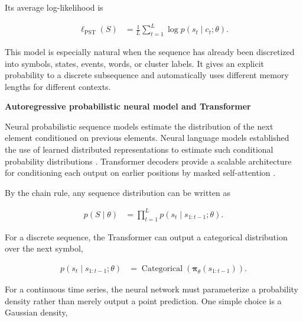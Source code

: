 \documentclass{book}
\providecommand{\ProjectDeepHeading}[2]{%
    \par\medskip\noindent\textbf{#2}\par\smallskip
}
\begin{document}
        \noindent
        Its average log-likelihood is

        \begin{align}
            \ell_{\mathrm{PST}}(S)
            &=
            \frac{1}{L}
            \sum_{t=1}^{L}
            \log p(s_t\mid c_t;\ensuremath{\theta}).
        \end{align}

        \noindent
        This model is especially natural when the sequence has already been discretized into symbols, states, events, words, or cluster labels. It gives an explicit probability to a discrete subsequence and automatically uses different memory lengths for different contexts.

    \ProjectDeepHeading{3}{Autoregressive probabilistic neural model and Transformer}

        Neural probabilistic sequence models estimate the distribution of the next element conditioned on previous elements. Neural language models established the use of learned distributed representations to estimate such conditional probability distributions \cite{bengio-2003-a-neural-probabilistic-language-model}. Transformer decoders provide a scalable architecture for conditioning each output on earlier positions by masked self-attention \cite{vaswani-2017-attention-is-all-you-need}.

        By the chain rule, any sequence distribution can be written as

        \begin{align}
            p(S\mid\ensuremath{\theta})
            &=
            \prod_{t=1}^{L}
            p(s_t\mid s_{1:t-1};\ensuremath{\theta}).
        \end{align}

        \noindent
        For a discrete sequence, the Transformer can output a categorical distribution over the next symbol,

        \begin{align}
            p(s_t\mid s_{1:t-1};\ensuremath{\theta})
            &=
            \operatorname{Categorical}
            \left(
            \boldsymbol{\ensuremath{\pi}}_\ensuremath{\theta}(s_{1:t-1})
            \right).
        \end{align}

        \noindent
        For a continuous time series, the neural network must parameterize a probability density rather than merely output a point prediction. One simple choice is a Gaussian density,
\end{document}
